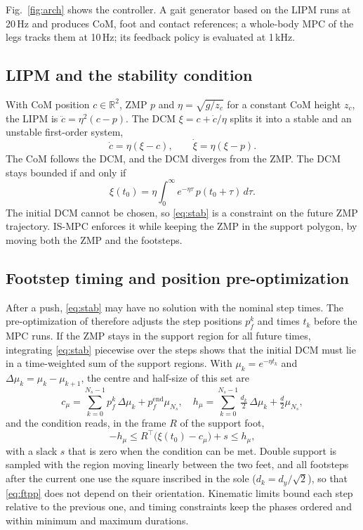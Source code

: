 \documentclass[conference]{IEEEtran}
\newcommand{\R}{\mathbb{R}}
\newcommand{\T}{^{\top}}
\begin{document}
Fig.~\ref{fig:arch} shows the controller.
A gait generator based on the LIPM runs at 20\,Hz and produces CoM, foot and contact references; a whole-body MPC of the legs tracks them at 10\,Hz; its feedback policy is evaluated at 1\,kHz.

\subsection{LIPM and the stability condition}
With CoM position $c\in\R^2$, ZMP $p$ and $\eta=\sqrt{g/z_c}$ for a constant CoM height $z_c$, the LIPM is $\ddot c=\eta^2(c-p)$.
The DCM $\xi=c+\dot c/\eta$ splits it into a stable and an unstable first-order system,
\begin{equation}
\dot c=\eta(\xi-c),\qquad \dot\xi=\eta(\xi-p).
\label{eq:dcm}
\end{equation}
The CoM follows the DCM, and the DCM diverges from the ZMP.
The DCM stays bounded if and only if \cite{lanari2014boundedness}
\begin{equation}
\xi(t_0)=\eta\int_{0}^{\infty}e^{-\eta\tau}\,p(t_0+\tau)\,d\tau .
\label{eq:stab}
\end{equation}
The initial DCM cannot be chosen, so \eqref{eq:stab} is a constraint on the future ZMP trajectory.
IS-MPC \cite{scianca2020ismpc} enforces it while keeping the ZMP in the support polygon, by moving both the ZMP and the footsteps.

\subsection{Footstep timing and position pre-optimization}
After a push, \eqref{eq:stab} may have no solution with the nominal step times.
The pre-optimization of \cite{dallard2025adios} therefore adjusts the step positions $p_f^k$ and times $t_k$ before the MPC runs.
If the ZMP stays in the support region for all future times, integrating \eqref{eq:stab} piecewise over the steps shows that the initial DCM must lie in a time-weighted sum of the support regions.
With $\mu_k=e^{-\eta t_k}$ and $\Delta\mu_k=\mu_k-\mu_{k+1}$, the centre and half-size of this set are
\begin{equation}
c_\mu=\sum_{k=0}^{N_s-1}p_f^k\,\Delta\mu_k+p_f^{\mathrm{end}}\mu_{N_s},\quad
h_\mu=\sum_{k=0}^{N_s-1}\tfrac{d_k}{2}\,\Delta\mu_k+\tfrac{d}{2}\mu_{N_s},
\label{eq:ch}
\end{equation}
and the condition reads, in the frame $R$ of the support foot,
\begin{equation}
-h_\mu\le R\T\big(\xi(t_0)-c_\mu\big)+s\le h_\mu ,
\label{eq:ftpp}
\end{equation}
with a slack $s$ that is zero when the condition can be met.
Double support is sampled with the region moving linearly between the two feet, and all footsteps after the current one use the square inscribed in the sole ($d_k=d_y/\sqrt2$), so that \eqref{eq:ftpp} does not depend on their orientation.
Kinematic limits bound each step relative to the previous one, and timing constraints keep the phases ordered and within minimum and maximum durations.
\end{document}
